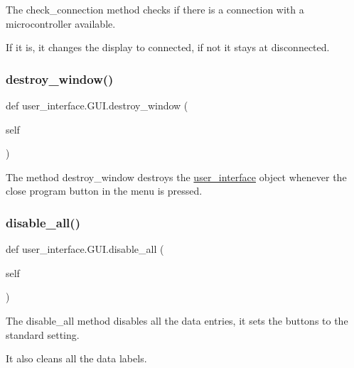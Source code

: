 The check\+\_\+connection method checks if there is a connection with a microcontroller available. 

If it is, it changes the display to connected, if not it stays at disconnected. \mbox{\label{classuser__interface_1_1GUI_a1e7024c7b8168615d4d8579336d192df}} 
\subsubsection{\texorpdfstring{destroy\+\_\+window()}{destroy\_window()}}
{\footnotesize\ttfamily def user\+\_\+interface.\+G\+U\+I.\+destroy\+\_\+window (\begin{DoxyParamCaption}\item[{}]{self }\end{DoxyParamCaption})}



The method destroy\+\_\+window destroys the \hyperlink{namespaceuser__interface}{user\+\_\+interface} object whenever the close program button in the menu is pressed. 

\mbox{\label{classuser__interface_1_1GUI_a2130bcd9bdd457ba51cac0458a8d3f96}} 
\subsubsection{\texorpdfstring{disable\+\_\+all()}{disable\_all()}}
{\footnotesize\ttfamily def user\+\_\+interface.\+G\+U\+I.\+disable\+\_\+all (\begin{DoxyParamCaption}\item[{}]{self }\end{DoxyParamCaption})}



The disable\+\_\+all method disables all the data entries, it sets the buttons to the standard setting. 

It also cleans all the data labels. \mbox{\label{classuser__interface_1_1GUI_a37f5777ca2d7aea9186d1447ada28faa}} 
